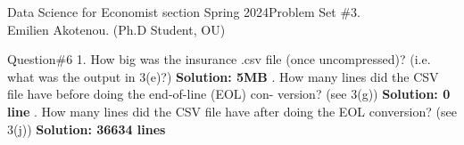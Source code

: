 \documentclass[12pt]{article}
\begin{document}
\noindent Data Science for Economist section Spring 2024\hfill Problem Set \#3.\\
Emilien Akotenou. (Ph.D Student, OU)

\hrulefill


\begin{section}{Question\#6}
1. How big was the insurance .csv file (once uncompressed)? (i.e. what was the output in 3(e)?) \newline \textbf{Solution: 5MB } \newline {}. How many lines did the CSV file have before doing the end-of-line (EOL) con- version? (see 3(g)) \newline \textbf{Solution: 0 line } \newline {}. How many lines did the CSV file have after doing the EOL conversion? (see 3(j)) \textbf{Solution: 36634 lines } 


\end{section}


 
\end{document}
